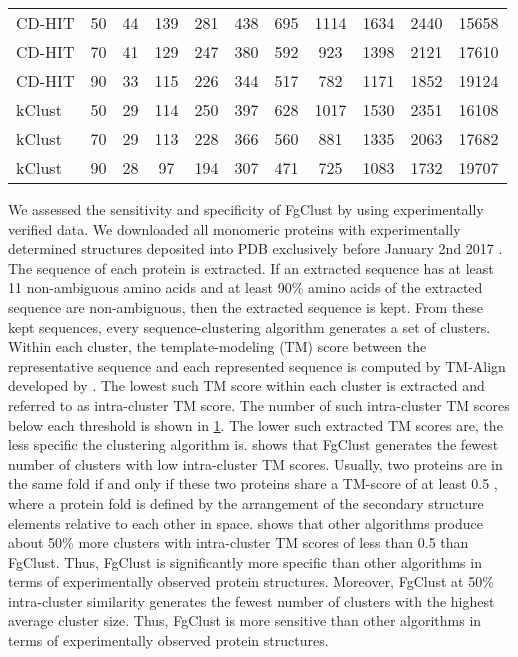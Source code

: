 \documentclass[11pt,letterpaper]{article}
\begin{document}
\begin{table}[t]
\begin{tabular}{l c c c c c c c c c c}
		CD-HIT & 50 & 44 & 139 & 281 & 438 & 695 & 1114 & 1634 & 2440 & 15658 \\
		CD-HIT & 70 & 41 & 129 & 247 & 380 & 592 & 923 & 1398 & 2121 & 17610 \\
		CD-HIT & 90 & 33 & 115 & 226 & 344 & 517 & 782 & 1171 & 1852 & 19124 \\
		
		kClust & 50 & 29 & 114 & 250 & 397 & 628 & 1017 & 1530 & 2351 & 16108 \\
		kClust & 70 & 29 & 113 & 228 & 366 & 560 & 881 & 1335 & 2063 & 17682 \\
		kClust & 90 & 28 & 97 & 194 & 307 & 471 & 725 & 1083 & 1732 & 19707 \\
		\bottomrule
	\end{tabular}
	\label{table:pdb}
\end{table}

We assessed the sensitivity and specificity of FgClust by using experimentally verified data.
We downloaded all monomeric proteins with experimentally determined structures deposited into PDB exclusively before January 2nd 2017 \citep{berman2006protein}.
The sequence of each protein is extracted.
If an extracted sequence has at least 11 non-ambiguous amino acids and at least 90\% amino acids of the extracted sequence are non-ambiguous, then the extracted sequence is kept.
From these kept sequences, every sequence-clustering algorithm generates a set of clusters.
Within each cluster, the template-modeling (TM) score between the representative sequence and each represented sequence is computed by TM-Align developed by \citet{zhang2005tm}.
The lowest such TM score within each cluster is extracted and referred to as intra-cluster TM score.
The number of such intra-cluster TM scores below each threshold is shown in \cref{table:pdb}.
The lower such extracted TM scores are, the less specific the clustering algorithm is.
 shows that FgClust generates the fewest number of clusters with low intra-cluster TM scores.
Usually, two proteins are in the same fold if and only if these two proteins share a TM-score of at least 0.5 \citep{xu2010significant}, where a protein fold is defined by the arrangement of the secondary structure elements relative to each other in space.
 shows that other algorithms produce about 50\% more clusters with intra-cluster TM scores of less than 0.5 than FgClust.
Thus, FgClust is significantly more specific than other algorithms in terms of experimentally observed protein structures.
Moreover, FgClust at 50\% intra-cluster similarity generates the fewest number of clusters with the highest average cluster size.
Thus, FgClust is more sensitive than other algorithms in terms of experimentally observed protein structures.
\end{document}
